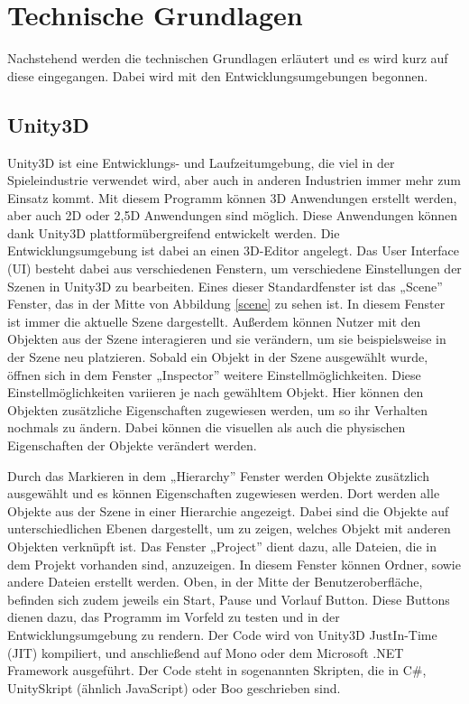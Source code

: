\chapter{Technische Grundlagen}
	Nachstehend werden die technischen Grundlagen erläutert und es wird kurz auf diese eingegangen. Dabei wird mit den Entwicklungsumgebungen begonnen.

\section{Unity3D}

Unity3D ist eine Entwicklungs- und Laufzeitumgebung, die viel in der Spieleindustrie verwendet wird, aber auch in anderen Industrien immer mehr zum Einsatz kommt. Mit diesem Programm können 3D Anwendungen erstellt werden, aber auch 2D oder 2,5D Anwendungen sind möglich. Diese Anwendungen können dank Unity3D plattformübergreifend entwickelt werden. Die Entwicklungsumgebung ist dabei an einen 3D-Editor angelegt. Das User Interface (UI) besteht dabei aus verschiedenen Fenstern, um verschiedene Einstellungen der Szenen in Unity3D zu bearbeiten. Eines dieser Standardfenster ist das „Scene” Fenster, das in der Mitte von Abbildung \ref{scene} zu sehen ist. In diesem Fenster ist immer die aktuelle Szene dargestellt. Außerdem können Nutzer mit den Objekten aus der Szene interagieren und sie verändern, um sie beispielsweise in der Szene neu platzieren. Sobald ein Objekt in der Szene ausgewählt wurde, öffnen sich in dem Fenster „Inspector” weitere Einstellmöglichkeiten. Diese Einstellmöglichkeiten variieren je nach gewähltem Objekt. Hier können den Objekten zusätzliche Eigenschaften zugewiesen werden, um so ihr Verhalten nochmals zu ändern. Dabei können die visuellen als auch die physischen Eigenschaften der Objekte verändert werden.

Durch das Markieren in dem „Hierarchy” Fenster werden Objekte zusätzlich ausgewählt und es können Eigenschaften zugewiesen werden. Dort werden alle Objekte aus der Szene in einer Hierarchie angezeigt. Dabei sind die Objekte auf unterschiedlichen Ebenen dargestellt, um zu zeigen, welches Objekt mit anderen Objekten verknüpft ist. Das Fenster „Project” dient dazu, alle Dateien, die in dem Projekt vorhanden sind, anzuzeigen. In diesem Fenster können Ordner, sowie andere Dateien erstellt werden. Oben, in der Mitte der Benutzeroberfläche, befinden sich zudem jeweils ein Start, Pause und Vorlauf Button. Diese Buttons dienen dazu, das Programm im Vorfeld zu testen und in der Entwicklungsumgebung zu rendern. Der Code wird von Unity3D JustIn-Time (JIT) kompiliert, und anschließend auf Mono oder dem Microsoft .NET Framework ausgeführt. Der Code steht in sogenannten Skripten, die in C#, UnitySkript (ähnlich JavaScript) oder Boo geschrieben sind.

